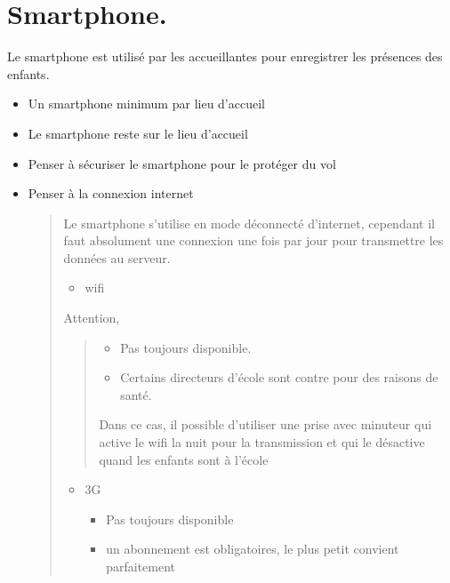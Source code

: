 \documentclass[letterpaper,10pt,english]{sphinxmanual}
\begin{document}
\section{Smartphone.}
\label{checklist:smartphone}
Le smartphone est utilisé par les accueillantes pour enregistrer les présences des enfants.
\begin{itemize}
\item {} 
Un smartphone minimum par lieu d'accueil

\item {} 
Le smartphone reste sur le lieu d'accueil

\item {} 
Penser à sécuriser le smartphone pour le protéger du vol

\item {} 
Penser à la connexion internet
\begin{quote}

Le smartphone s'utilise en mode déconnecté d'internet,
cependant il faut absolument une connexion une fois par jour pour transmettre les données au serveur.
\begin{itemize}
\item {} 
wifi

\end{itemize}

Attention,
\begin{quote}
\begin{itemize}
\item {} 
Pas toujours disponible.

\item {} 
Certains directeurs d'école sont contre pour des raisons de santé.

\end{itemize}

Dans ce cas, il possible d'utiliser une prise avec minuteur qui active le wifi la nuit pour la transmission
et qui le désactive quand les enfants sont à l'école
\end{quote}
\begin{itemize}
\item {} 
3G
\begin{itemize}
\item {} 
Pas toujours disponible

\item {} 
un abonnement est obligatoires, le plus petit convient parfaitement

\end{itemize}

\end{itemize}
\end{quote}

\end{itemize}
\end{document}
